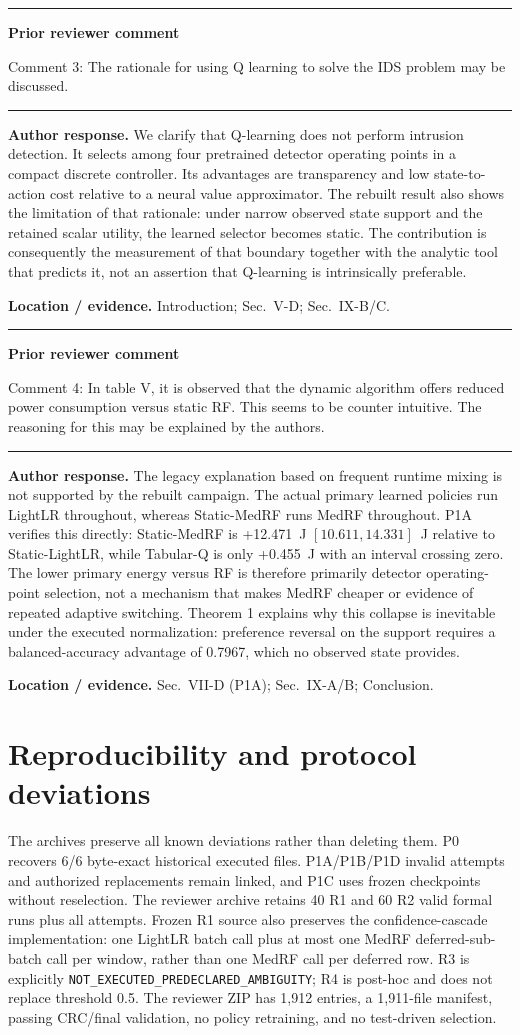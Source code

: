\documentclass[11pt]{article}
\newenvironment{qbox}
    {\par\vspace{4pt}\noindent\begin{minipage}{\linewidth}\rule{\linewidth}{0.4pt}\par\noindent\textbf{Prior reviewer comment}\par\noindent}
    {\par\rule{\linewidth}{0.4pt}\end{minipage}\par\vspace{4pt}}
\begin{document}
\begin{qbox}
Comment 3: The rationale for using Q learning to solve the IDS problem may be discussed.
\end{qbox}

\textbf{Author response.} We clarify that Q-learning does not perform intrusion detection. It selects among four pretrained detector operating points in a compact discrete controller. Its advantages are transparency and low state-to-action cost relative to a neural value approximator. The rebuilt result also shows the limitation of that rationale: under narrow observed state support and the retained scalar utility, the learned selector becomes static. The contribution is consequently the measurement of that boundary together with the analytic tool that predicts it, not an assertion that Q-learning is intrinsically preferable.

\textbf{Location / evidence.} Introduction; Sec.~V-D; Sec.~IX-B/C.

\begin{qbox}
Comment 4: In table V, it is observed that the dynamic algorithm offers reduced power consumption versus static RF. This seems to be counter intuitive. The reasoning for this may be explained by the authors.
\end{qbox}

\textbf{Author response.} The legacy explanation based on frequent runtime mixing is not supported by the rebuilt campaign. The actual primary learned policies run LightLR throughout, whereas Static-MedRF runs MedRF throughout. P1A verifies this directly: Static-MedRF is +12.471~J $[10.611, 14.331]$~J relative to Static-LightLR, while Tabular-Q is only +0.455~J with an interval crossing zero. The lower primary energy versus RF is therefore primarily detector operating-point selection, not a mechanism that makes MedRF cheaper or evidence of repeated adaptive switching. Theorem 1 explains why this collapse is inevitable under the executed normalization: preference reversal on the support requires a balanced-accuracy advantage of 0.7967, which no observed state provides.

\textbf{Location / evidence.} Sec.~VII-D (P1A); Sec.~IX-A/B; Conclusion.

\section*{Reproducibility and protocol deviations}
The archives preserve all known deviations rather than deleting them. P0 recovers 6/6 byte-exact historical executed files. P1A/P1B/P1D invalid attempts and authorized replacements remain linked, and P1C uses frozen checkpoints without reselection. The reviewer archive retains 40 R1 and 60 R2 valid formal runs plus all attempts. Frozen R1 source also preserves the confidence-cascade implementation: one LightLR batch call plus at most one MedRF deferred-sub-batch call per window, rather than one MedRF call per deferred row. R3 is explicitly \texttt{NOT\_EXECUTED\_}\allowbreak\texttt{PREDECLARED\_AMBIGUITY}; R4 is post-hoc and does not replace threshold 0.5. The reviewer ZIP has 1{,}912 entries, a 1{,}911-file manifest, passing CRC/final validation, no policy retraining, and no test-driven selection.
\end{document}
